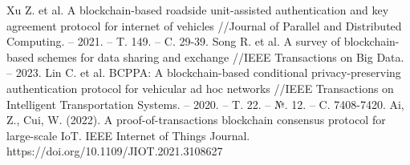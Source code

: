 \begin{thebibliography}{XXX}
 Xu Z. et al. A blockchain-based roadside unit-assisted authentication and key agreement protocol for internet of vehicles //Journal of Parallel and Distributed Computing. – 2021. – T. 149. – C. 29-39.
 Song R. et al. A survey of blockchain-based schemes for data sharing and exchange //IEEE Transactions on Big Data. – 2023.
 Lin C. et al. BCPPA: A blockchain-based conditional privacy-preserving authentication protocol for vehicular ad hoc networks //IEEE Transactions on Intelligent Transportation Systems. – 2020. – T. 22. – №. 12. – C. 7408-7420.
 Ai, Z., Cui, W. (2022). A proof-of-transactions blockchain consensus protocol for large-scale IoT. IEEE Internet of Things Journal. https://doi.org/10.1109/JIOT.2021.3108627
\end{thebibliography}
\clearpage
